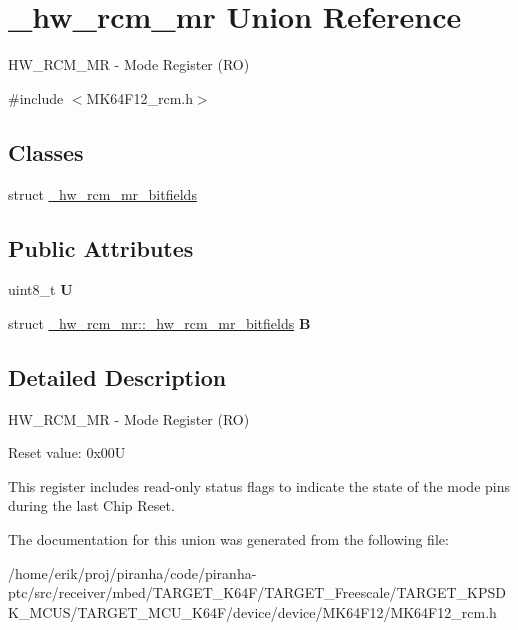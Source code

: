 \hypertarget{union__hw__rcm__mr}{}\section{\+\_\+hw\+\_\+rcm\+\_\+mr Union Reference}
\label{union__hw__rcm__mr}


H\+W\+\_\+\+R\+C\+M\+\_\+\+MR -\/ Mode Register (RO)  




{\ttfamily \#include $<$M\+K64\+F12\+\_\+rcm.\+h$>$}

\subsection*{Classes}
\begin{DoxyCompactItemize}
\item 
struct \hyperlink{struct__hw__rcm__mr_1_1__hw__rcm__mr__bitfields}{\+\_\+hw\+\_\+rcm\+\_\+mr\+\_\+bitfields}
\end{DoxyCompactItemize}
\subsection*{Public Attributes}
\begin{DoxyCompactItemize}
\item 
uint8\+\_\+t {\bfseries U}\hypertarget{union__hw__rcm__mr_ab4c97984e5d5f2fc1e9c5b96dece5fa4}{}\label{union__hw__rcm__mr_ab4c97984e5d5f2fc1e9c5b96dece5fa4}

\item 
struct \hyperlink{struct__hw__rcm__mr_1_1__hw__rcm__mr__bitfields}{\+\_\+hw\+\_\+rcm\+\_\+mr\+::\+\_\+hw\+\_\+rcm\+\_\+mr\+\_\+bitfields} {\bfseries B}\hypertarget{union__hw__rcm__mr_a927fc240fca0e90060f5524b8d8fae56}{}\label{union__hw__rcm__mr_a927fc240fca0e90060f5524b8d8fae56}

\end{DoxyCompactItemize}


\subsection{Detailed Description}
H\+W\+\_\+\+R\+C\+M\+\_\+\+MR -\/ Mode Register (RO) 

Reset value\+: 0x00U

This register includes read-\/only status flags to indicate the state of the mode pins during the last Chip Reset. 

The documentation for this union was generated from the following file\+:\begin{DoxyCompactItemize}
\item 
/home/erik/proj/piranha/code/piranha-\/ptc/src/receiver/mbed/\+T\+A\+R\+G\+E\+T\+\_\+\+K64\+F/\+T\+A\+R\+G\+E\+T\+\_\+\+Freescale/\+T\+A\+R\+G\+E\+T\+\_\+\+K\+P\+S\+D\+K\+\_\+\+M\+C\+U\+S/\+T\+A\+R\+G\+E\+T\+\_\+\+M\+C\+U\+\_\+\+K64\+F/device/device/\+M\+K64\+F12/M\+K64\+F12\+\_\+rcm.\+h\end{DoxyCompactItemize}
